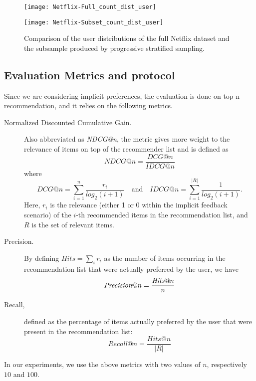 \documentclass[sigconf]{acmart}
\numberwithin{equation}{section}
\begin{document}
\begin{figure}[h!]
\begin{minipage}[t]{0.45\linewidth}
    \texttt{[image: Netflix-Full\_count\_dist\_user]}
\end{minipage}\hfill \begin{minipage}[t]{0.45\linewidth}
    \texttt{[image: Netflix-Subset\_count\_dist\_user]}
\end{minipage}
  \vspace{-5mm}
  \caption{Comparison of the user distributions of the full Netflix
    dataset and the subsample produced by progressive stratified
    sampling.}
    \label{fig:netflix_dist}
\end{figure}


\vspace*{-5mm}
\subsection{Evaluation Metrics and protocol}
Since we are considering implicit preferences, the evaluation is
done on top-n recommendation, and it relies on the following
metrics.
\begin{description}
\item[Normalized Discounted Cumulative Gain.] Also abbreviated as
  \textit{NDCG@n}, the metric gives more weight to the relevance of
  items on top of the recommender list and is defined as
$$
  \textit{NDCG@n} = \frac{\textit{DCG@n}}{\textit{IDCG@n}}
$$
where
$$
\textit{DCG@n} =\sum_{i=1}^{n} \frac{r_{i}}{log_{2}(i+1)}  \quad\text{and}\quad 
\textit{IDCG@n} = \sum_{i=1}^{|\textit{R}|} \frac{1}{log_{2}(i+1)}.
$$
Here, $r_i$ is the relevance (either 1 or 0 within the implicit
feedback scenario) of the $i$-th recommended items in the
recommendation list, and $R$ is the set of relevant items. 
\item[Precision.] By defining $\textit{Hits} = \sum_i r_i$ as the number of items
  occurring in the recommendation list that were actually
  preferred by the user, we have
  $$
  \vspace*{-1mm}
  \textit{Precision}@n = \frac{\textit{Hits}@n}{n}
  $$
\item[Recall,] defined as the percentage of items actually preferred by the user
  that were present in the recommendation list: 
$$
Recall@n  = \frac{\textit{Hits}@n}{|R|}
$$
\end{description}
In our experiments, we use the above metrics with two values of $n$,
respectively $10$ and $100$. 
\end{document}
